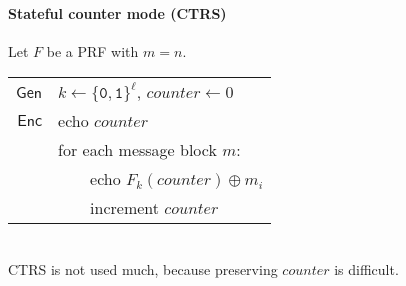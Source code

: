 \documentclass[11pt]{article}
\newcommand{\Gen}{\ensuremath{\mathsf{Gen}}}
\newcommand{\Enc}{\ensuremath{\mathsf{Enc}}}
\newcommand{\bit}{\ensuremath{\{\texttt{0},\texttt{1}\}}}
\theoremstyle{remark}
\begin{document}
\paragraph{Stateful counter mode (CTRS)}
Let $F$ be a PRF with $m = n$.
~\\[5pt]
\begin{tabular}{r|l}
\Gen & $k \leftarrow \bit^\ell$, $counter \leftarrow 0$ \\[5pt]
\Enc & echo $counter$ \\
     & for each message block $m$: \\
     & ~~~~echo $F_k(counter) \oplus m_i$ \\
     & ~~~~increment $counter$
\end{tabular}\\

CTRS is not used much, because preserving $counter$ is difficult.
\end{document}
